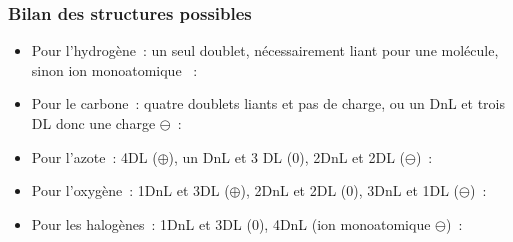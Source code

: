 \documentclass[../../main/main.tex]{subfiles}
\begin{document}
\subsubsection{Bilan des structures possibles}
\begin{itemize}[label=$\diamond$]
	\item Pour l'hydrogène~: un seul doublet, nécessairement liant pour une
	      molécule, sinon ion monoatomique ~:
	      \vspace*{-10pt}
	\item Pour le carbone~: quatre doublets liants et pas de charge, ou un DnL
	      et trois DL donc une charge $\ominus$~:
	      \vspace*{-10pt}
	\item Pour l'azote~: 4DL ($\oplus$), un DnL et 3 DL (0), 2DnL et 2DL
	      ($\ominus$)~:
	\item Pour l'oxygène~: 1DnL et 3DL ($\oplus$), 2DnL et 2DL (0), 3DnL et 1DL
	      ($\ominus$)~:
	\item Pour les halogènes~: 1DnL et 3DL (0), 4DnL (ion monoatomique
	      $\ominus$)~:
\end{itemize}
\end{document}
